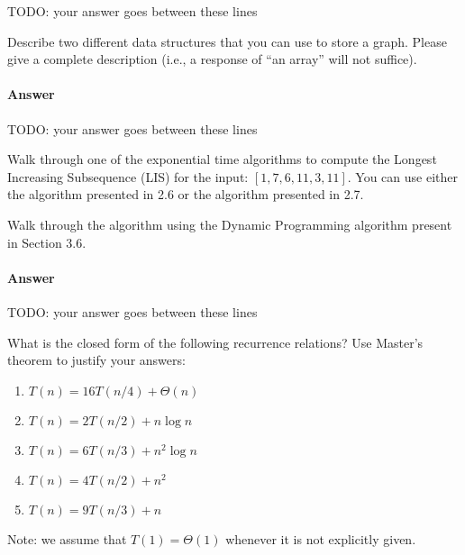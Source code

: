 \documentclass{article}
\begin{document}
TODO: your answer goes between these lines




\nextprob
{}

Describe two different data structures that you can use to store a graph.
Please give a complete description (i.e., a response of ``an array'' will not
suffice).

\paragraph{Answer}


TODO: your answer goes between these lines



\nextprob
{}

Walk through one of the exponential time algorithms to compute the Longest
Increasing Subsequence (LIS) for the input: $\left[ 1, 7, 6, 11, 3, 11 \right]$.
You can use either the algorithm presented in 2.6 or the algorithm presented in
2.7.

Walk through the algorithm using the Dynamic Programming algorithm present in
Section 3.6.

\paragraph{Answer}


TODO: your answer goes between these lines


\nextprob
{}

What is the closed form of the following recurrence relations?  Use Master's
theorem to justify your answers:
\begin{enumerate}
    \item $T(n) = 16 T(n/4) + \Theta(n)$
    \item $T(n) = 2 T(n/2) + n \log{n}$
    \item $T(n) = 6 T(n/3) + n^2 \log{n}$
    \item $T(n) = 4 T(n/2) + n^2$
    \item $T(n) = 9 T(n/3) + n$
\end{enumerate}
Note: we assume that $T(1)=\Theta(1)$ whenever it is not explicitly given.
\end{document}
